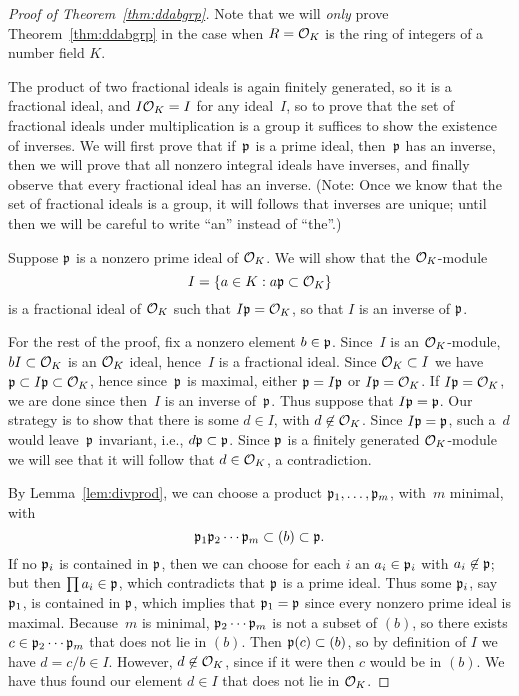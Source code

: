 \begin{proof}[Proof of Theorem~\ref{thm:ddabgrp}]
  Note that we will {\em only} prove Theorem~\ref{thm:ddabgrp} in the
  case when $R=\mathcal{O}_K$ is the ring of integers of a number field $K$.

The product of two fractional ideals is again finitely generated, so
it is a fractional ideal, and $I\mathcal{O}_K=I$ for any ideal~$I$,
so to prove that the set of fractional ideals under multiplication is
a group it suffices to show the existence of inverses.  We will first
prove that if~$\mathfrak{p}$ is a prime ideal, then~$\mathfrak{p}$ has an inverse, then we
will prove that all nonzero integral ideals have inverses, and finally
observe that every fractional ideal has an inverse.  (Note: Once we
know that the set of fractional ideals is a group, it will follows
that inverses are unique; until then we will be careful to write
``an'' instead of ``the''.)

Suppose $\mathfrak{p}$ is a nonzero prime ideal of $\mathcal{O}_K$.   We will show that
the $\mathcal{O}_K$-module
$$
  I = \{a \in K : a\mathfrak{p} \subset \mathcal{O}_K \}
$$
is a fractional ideal of $\mathcal{O}_K$ such that $I\mathfrak{p} = \mathcal{O}_K$, so that
$I$ is an inverse of $\mathfrak{p}$.

For the rest of the proof, fix a nonzero element $b\in \mathfrak{p}$.  Since~$I$
is an $\mathcal{O}_K$-module, $bI\subset \mathcal{O}_K$ is an $\mathcal{O}_K$ ideal, hence~$I$ is
a fractional ideal.  Since $\mathcal{O}_K \subset I$ we have $\mathfrak{p} \subset I \mathfrak{p}
\subset \mathcal{O}_K$, hence since~$\mathfrak{p}$ is maximal, either $\mathfrak{p} = I\mathfrak{p}$ or $I\mathfrak{p}
= \mathcal{O}_K$.  If $I\mathfrak{p}=\mathcal{O}_K$, we are done since then~$I$ is an inverse
of~$\mathfrak{p}$.  Thus suppose that $I\mathfrak{p}=\mathfrak{p}$.  Our strategy is to show that
there is some $d\in I$, with $d\not\in\mathcal{O}_K$.  Since $I\mathfrak{p}=\mathfrak{p}$, such
a~$d$ would leave~$\mathfrak{p}$ invariant, i.e., $d \mathfrak{p} \subset \mathfrak{p}$.  Since $\mathfrak{p}$
is a finitely generated $\mathcal{O}_K$-module we will see that it will follow that $d\in \mathcal{O}_K$,
a contradiction.

By Lemma~\ref{lem:divprod}, we can choose a product $\mathfrak{p}_1,\ldots, \mathfrak{p}_m$,
with~$m$ minimal, with
$$
\mathfrak{p}_1\mathfrak{p}_2\cdots \mathfrak{p}_m \subset (b) \subset \mathfrak{p}.
$$ If no $\mathfrak{p}_i$ is contained in $\mathfrak{p}$, then we can choose for each $i$
an $a_i \in \mathfrak{p}_i$ with $a_i\not\in \mathfrak{p}$; but then $\prod a_i\in \mathfrak{p}$,
which contradicts that $\mathfrak{p}$ is a prime ideal.  Thus some $\mathfrak{p}_i$, say
$\mathfrak{p}_1$, is contained in $\mathfrak{p}$, which implies that $\mathfrak{p}_1 = \mathfrak{p}$ since
every nonzero prime ideal is maximal.  Because~$m$ is minimal,
$\mathfrak{p}_2\cdots \mathfrak{p}_m$ is not a subset of $(b)$, so there exists $c\in
\mathfrak{p}_2\cdots \mathfrak{p}_m$ that does not lie in $(b)$. Then $\mathfrak{p}(c) \subset (b)$,
so by definition of $I$ we have $d=c/b\in I$.  However, $d\not\in
\mathcal{O}_K$, since if it were then $c$ would be in $(b)$.  We have thus
found our element $d\in I$ that does not lie in $\mathcal{O}_K$.


\end{proof}
